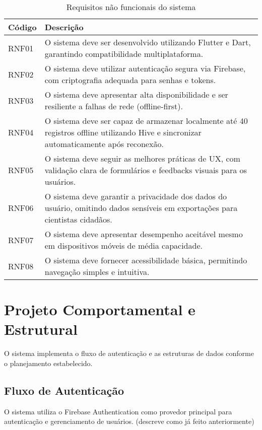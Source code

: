 \begin{table}[H]
    \centering
    \caption{Requisitos não funcionais do sistema}
    \label{tab:req-nao-funcionais}
    \begin{tabular}{|p{2cm}|p{11cm}|}
    \hline
    \textbf{Código} & \textbf{Descrição} \\ \hline
    RNF01 & O sistema deve ser desenvolvido utilizando Flutter e Dart, garantindo compatibilidade multiplataforma. \\ \hline
    RNF02 & O sistema deve utilizar autenticação segura via Firebase, com criptografia adequada para senhas e tokens. \\ \hline
    RNF03 & O sistema deve apresentar alta disponibilidade e ser resiliente a falhas de rede (offline-first). \\ \hline
    RNF04 & O sistema deve ser capaz de armazenar localmente até 40 registros offline utilizando Hive e sincronizar automaticamente após reconexão. \\ \hline
    RNF05 & O sistema deve seguir as melhores práticas de UX, com validação clara de formulários e feedbacks visuais para os usuários. \\ \hline
    RNF06 & O sistema deve garantir a privacidade dos dados do usuário, omitindo dados sensíveis em exportações para cientistas cidadãos. \\ \hline
    RNF07 & O sistema deve apresentar desempenho aceitável mesmo em dispositivos móveis de média capacidade. \\ \hline
    RNF08 & O sistema deve fornecer acessibilidade básica, permitindo navegação simples e intuitiva. \\ \hline
    \end{tabular}
    \end{table}

\section{Projeto Comportamental e Estrutural}

O sistema implementa o fluxo de autenticação e as estruturas de dados conforme o planejamento estabelecido.

\subsection{Fluxo de Autenticação}

O sistema utiliza o Firebase Authentication como provedor principal para autenticação e gerenciamento de usuários. (descreve como já feito anteriormente)


